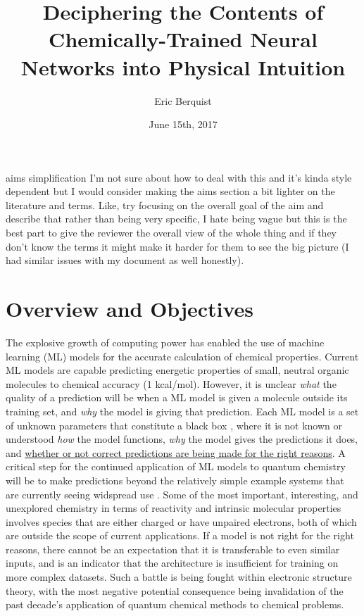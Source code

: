 \documentclass[12pt]{article}
\author{Eric Berquist}
\date{June 15th, 2017}
\title{Deciphering the Contents of Chemically-Trained Neural Networks into Physical Intuition}
\begin{document}
\maketitle
\begin{anfxnote}{aims simplification}
I'm not sure about how to deal with this and it's kinda style dependent but I would consider making the aims section a bit lighter on the literature and terms. Like, try focusing on the overall goal of the aim and describe that rather than being very specific, I hate being vague but this is the best part to give the reviewer the overall view of the whole thing and if they don't know the terms it might make it harder for them to see the big picture (I had similar issues with my document as well honestly).
\end{anfxnote}

\section{Overview and Objectives}
\label{sec:org75e4007}

The explosive growth of computing power has enabled the use of machine learning (ML) models for the accurate calculation of chemical properties. Current ML models are capable predicting energetic properties of small, neutral organic molecules to chemical accuracy (1 kcal/mol)\cite{2017arXiv170205532F}. However, it is unclear \emph{what} the quality of a prediction will be when a ML model is given a molecule outside its training set, and \emph{why} the model is giving that prediction. Each ML model is a set of unknown parameters that constitute a black box \cite{wiki:blackbox}, where it is not known or understood \emph{how} the model functions, \emph{why} the model gives the predictions it does, and \uline{whether or not correct predictions are being made for the right reasons}\cite{2017arXiv170303717S}. A critical step for the continued application of ML models to quantum chemistry will be to make predictions beyond the relatively simple example systems that are currently seeing widspread use \cite{Ramakrishnan:2014ij}. Some of the most important, interesting, and unexplored chemistry in terms of reactivity and intrinsic molecular properties involves species that are either charged or have unpaired electrons, both of which are outside the scope of current applications. If a model is not right for the right reasons, there cannot be an expectation that it is transferable to even similar inputs, and is an indicator that the architecture is insufficient for training on more complex datasets. Such a battle is being fought within electronic structure theory\cite{Zhao2008,Medvedev49,Kepp496,Medvedev496}, with the most negative potential consequence being invalidation of the past decade's application of quantum chemical methods to chemical problems.
\end{document}
